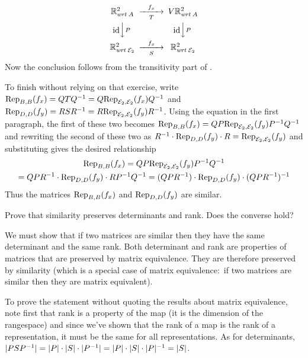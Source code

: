 \begin{exercises}
\begin{answer}
        \begin{equation*}
          \begin{CD}
            \Re^2_\wrt{A}                   
               @>f_x>T>        
               V\Re^2_\wrt{A}       \\
            @V\scriptstyle\identity VPV                
               @V\scriptstyle\identity VPV \\
            \Re^2_\wrt{\stdbasis_2}         
               @>f_x>S>        
               \Re^2_\wrt{\stdbasis_2}
          \end{CD}
        \end{equation*}
        Now the conclusion follows from the transitivity part of
        .
        
        To finish without relying on that exercise, write
        $\rep{f_x}{B,B}=QTQ^{-1}=Q\rep{f_x}{\stdbasis_2,\stdbasis_2}Q^{-1}$
        and
        $\rep{f_y}{D,D}=RSR^{-1}=R\rep{f_y}{\stdbasis_2,\stdbasis_2}R^{-1}$.
        Using the equation in the first paragraph, 
        the first of these two becomes
        $\rep{f_x}{B,B}=QP\rep{f_y}{\stdbasis_2,\stdbasis_2}P^{-1}Q^{-1}$
        and  
        rewriting the second of these two as
        $R^{-1}\cdot\rep{f_y}{D,D}\cdot R=\rep{f_y}{\stdbasis_2,\stdbasis_2}$
        and substituting gives the desired relationship
        \begin{multline*}
          \rep{f_x}{B,B}
          =QP\rep{f_y}{\stdbasis_2,\stdbasis_2}P^{-1}Q^{-1}  \\
          =QPR^{-1}\cdot\rep{f_y}{D,D}\cdot RP^{-1}Q^{-1}
          =(QPR^{-1})\cdot\rep{f_y}{D,D}\cdot (QPR^{-1})^{-1}
        \end{multline*}
        Thus the matrices \( \rep{f_x}{B,B}  \) and \( \rep{f_y}{D,D} \) are
        similar. 
      \end{answer}
  \item 
     Prove that similarity preserves determinants and rank.
     Does the converse hold?
     \begin{answer}
       We must show that if two matrices are similar then they have the same
       determinant and the same rank.
       Both determinant and rank are properties of matrices that 
       are preserved by matrix equivalence. 
       They are therefore preserved by similarity (which is a 
       special case of matrix equivalence:~if two matrices
       are similar then they are matrix equivalent).

       To prove the statement without quoting the results about
       matrix equivalence, note first that
       rank is a property of the map (it is the dimension of the rangespace)
       and since we've shown that 
       the rank of a map is the rank of a representation,
       it must be the same for all representations.
       As for determinants,
       \( \deter{PSP^{-1}}=\deter{P}\cdot\deter{S}\cdot\deter{P^{-1}}
          =\deter{P}\cdot\deter{S}\cdot\deter{P}^{-1}=\deter{S} \).


\end{answer}
\end{exercises}
